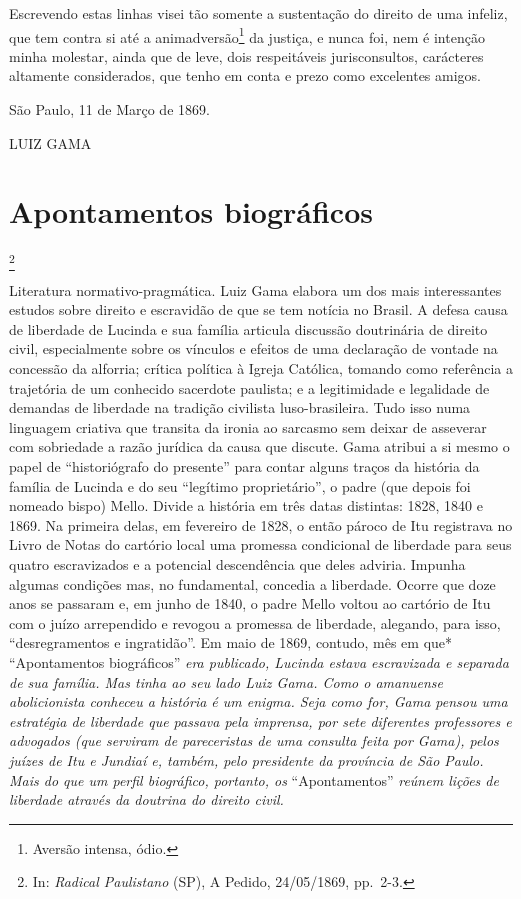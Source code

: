 Escrevendo estas linhas visei tão somente a sustentação do direito de
uma infeliz, que tem contra si até a animadversão\footnote{Aversão
  intensa, ódio.} da justiça, e nunca foi, nem é intenção minha
molestar, ainda que de leve, dois respeitáveis jurisconsultos,
carácteres altamente considerados, que tenho em conta e prezo como
excelentes amigos.

São Paulo, 11 de Março de 1869.

LUIZ GAMA

\chapter{Apontamentos biográficos}\footnote{In: \emph{Radical Paulistano}
  (SP), A Pedido, 24/05/1869, pp.~2-3.}

\begin{didascalia}
Literatura normativo-pragmática. Luiz Gama elabora um dos mais
interessantes estudos sobre direito e escravidão de que se tem notícia
no Brasil. A defesa causa de liberdade de Lucinda e sua família articula
discussão doutrinária de direito civil, especialmente sobre os vínculos
e efeitos de uma declaração de vontade na concessão da alforria; crítica
política à Igreja Católica, tomando como referência a trajetória de um
conhecido sacerdote paulista; e a legitimidade e legalidade de demandas
de liberdade na tradição civilista luso-brasileira. Tudo isso numa
linguagem criativa que transita da ironia ao sarcasmo sem deixar de
asseverar com sobriedade a razão jurídica da causa que discute. Gama
atribui a si mesmo o papel de ``historiógrafo do presente'' para contar
alguns traços da história da família de Lucinda e do seu ``legítimo
proprietário'', o padre (que depois foi nomeado bispo) Mello. Divide a
história em três datas distintas: 1828, 1840 e 1869. Na primeira delas,
em fevereiro de 1828, o então pároco de Itu registrava no Livro de Notas
do cartório local uma promessa condicional de liberdade para seus quatro
escravizados e a potencial descendência que deles adviria. Impunha
algumas condições mas, no fundamental, concedia a liberdade. Ocorre que
doze anos se passaram e, em junho de 1840, o padre Mello voltou ao
cartório de Itu com o juízo arrependido e revogou a promessa de
liberdade, alegando, para isso, ``desregramentos e ingratidão''. Em maio
de 1869, contudo, mês em que* ``Apontamentos biográficos'' \emph{era
publicado, Lucinda estava escravizada e separada de sua família. Mas
tinha ao seu lado Luiz Gama. Como o amanuense abolicionista conheceu a
história é um enigma. Seja como for, Gama pensou uma estratégia de
liberdade que passava pela imprensa, por sete diferentes professores e
advogados (que serviram de pareceristas de uma consulta feita por Gama),
pelos juízes de Itu e Jundiaí e, também, pelo presidente da província de
São Paulo. Mais do que um perfil biográfico, portanto, os}
``Apontamentos'' \emph{reúnem lições de liberdade através da doutrina do
direito civil.}
\end{didascalia}

